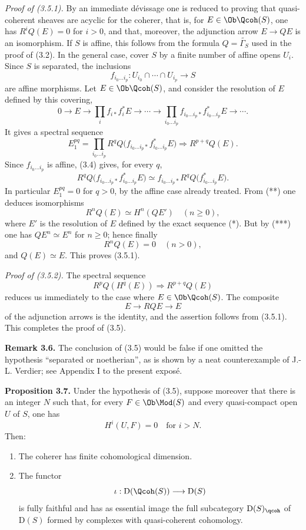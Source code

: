 \documentclass[11pt]{article}
\begin{document}
\emph{Proof of (3.5.1).} By an immediate dévissage one is reduced to proving that quasi-coherent sheaves are acyclic for the coherer, that is, for $E\in\Ob\Qcoh(S)$, one has $R^iQ(E)=0$ for $i>0$, and that, moreover, the adjunction arrow $E\to QE$ is an isomorphism. If $S$ is affine, this follows from the formula $Q=\widetilde{\Gamma_S}$ used in the proof of (3.2). In the general case, cover $S$ by a finite number of affine opens $U_i$. Since $S$ is separated, the inclusions
\[
 f_{i_0\ldots i_p}:U_{i_0}\cap\cdots\cap U_{i_p}\longrightarrow S
\]
are affine morphisms. Let $E\in\Ob\Qcoh(S)$, and consider the resolution of $E$ defined by this covering,
\begin{equation}\tag{*}
 0\longrightarrow E\longrightarrow \prod_i f_{i*}f_i^*E\longrightarrow\cdots\longrightarrow
 \prod_{i_0\ldots i_p}f_{i_0\ldots i_p*}f_{i_0\ldots i_p}^*E\longrightarrow\cdots .
\end{equation}
It gives a spectral sequence
\begin{equation}\tag{**}
 E_1^{pq}=\prod_{i_0\ldots i_p}R^qQ\bigl(f_{i_0\ldots i_p*}f_{i_0\ldots i_p}^*E\bigr)
 \Longrightarrow R^{p+q}Q(E).
\end{equation}
Since $f_{i_0\ldots i_p}$ is affine, (3.4) gives, for every $q$,
\begin{equation}\tag{***}
 R^qQ\bigl(f_{i_0\ldots i_p*}f_{i_0\ldots i_p}^*E\bigr)
 \simeq f_{i_0\ldots i_p*}R^qQ\bigl(f_{i_0\ldots i_p}^*E\bigr).
\end{equation}
In particular $E_1^{pq}=0$ for $q>0$, by the affine case already treated. From (**) one deduces isomorphisms
\[
 R^nQ(E)\simeq H^n(QE')\quad(n\geq0),
\]
where $E'$ is the resolution of $E$ defined by the exact sequence (*). But by (***) one has $QE^n\simeq E^n$ for $n\geq0$; hence finally
\[
 R^nQ(E)=0\quad(n>0),
\]
and $Q(E)\simeq E$. This proves (3.5.1).

\emph{Proof of (3.5.2).} The spectral sequence
\[
 R^pQ(H^q(E))\Longrightarrow R^{p+q}Q(E)
\]
reduces us immediately to the case where $E\in\Ob\Qcoh(S)$. The composite
\[
 E\longrightarrow RQE\longrightarrow E
\]
of the adjunction arrows is the identity, and the assertion follows from (3.5.1). This completes the proof of (3.5).

\textbf{Remark 3.6.} The conclusion of (3.5) would be false if one omitted the hypothesis ``separated or noetherian'', as is shown by a neat counterexample of J.-L. Verdier; see Appendix I to the present exposé.

\textbf{Proposition 3.7.} Under the hypothesis of (3.5), suppose moreover that there is an integer $N$ such that, for every $F\in\Ob\Mod(S)$ and every quasi-compact open $U$ of $S$, one has
\[
 H^i(U,F)=0\quad\text{for }i>N.
\]
Then:
\begin{enumerate}[label=\alph*)]
\item The coherer has finite cohomological dimension.
\item The functor
\[
 \iota:\mathrm D(\Qcoh(S))\longrightarrow \mathrm D(S)
\]
is fully faithful and has as essential image the full subcategory $\mathrm D(S)_{\qcoh}$ of $\mathrm D(S)$ formed by complexes with quasi-coherent cohomology.
\end{enumerate}
\end{document}
